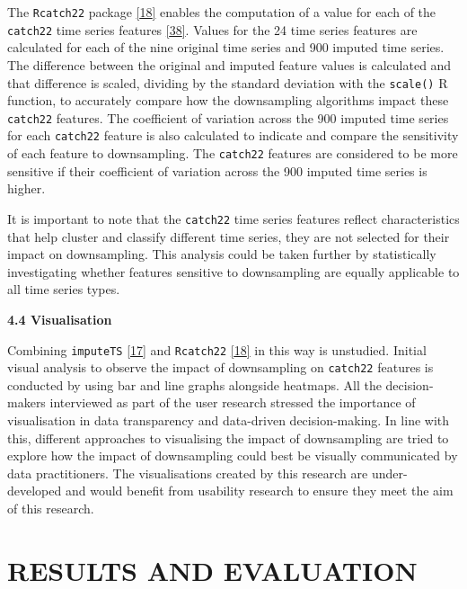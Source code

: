 \documentclass{article}
\begin{document}
The \texttt{Rcatch22} package
\protect\hyperlink{ref-catch22_R}{{[}18{]}} enables the computation of a
value for each of the \texttt{catch22} time series features
\protect\hyperlink{ref-catch22}{{[}38{]}}. Values for the 24 time series
features are calculated for each of the nine original time series and
900 imputed time series. The difference between the original and imputed
feature values is calculated and that difference is scaled, dividing by
the standard deviation with the \texttt{scale()} R function, to
accurately compare how the downsampling algorithms impact these
\texttt{catch22} features. The coefficient of variation across the 900
imputed time series for each \texttt{catch22} feature is also calculated
to indicate and compare the sensitivity of each feature to downsampling.
The \texttt{catch22} features are considered to be more sensitive if
their coefficient of variation across the 900 imputed time series is
higher.

It is important to note that the \texttt{catch22} time series features
reflect characteristics that help cluster and classify different time
series, they are not selected for their impact on downsampling. This
analysis could be taken further by statistically investigating whether
features sensitive to downsampling are equally applicable to all time
series types.

\textbf{4.4 Visualisation}

Combining \texttt{imputeTS} \protect\hyperlink{ref-imputeTS_R}{{[}17{]}}
and \texttt{Rcatch22} \protect\hyperlink{ref-catch22_R}{{[}18{]}} in
this way is unstudied. Initial visual analysis to observe the impact of
downsampling on \texttt{catch22} features is conducted by using bar and
line graphs alongside heatmaps. All the decision-makers interviewed as
part of the user research stressed the importance of visualisation in
data transparency and data-driven decision-making. In line with this,
different approaches to visualising the impact of downsampling are tried
to explore how the impact of downsampling could best be visually
communicated by data practitioners. The visualisations created by this
research are under-developed and would benefit from usability research
to ensure they meet the aim of this research.

\hypertarget{results-and-evaluation}{%
\section{RESULTS AND EVALUATION}\label{results-and-evaluation}}
\end{document}
